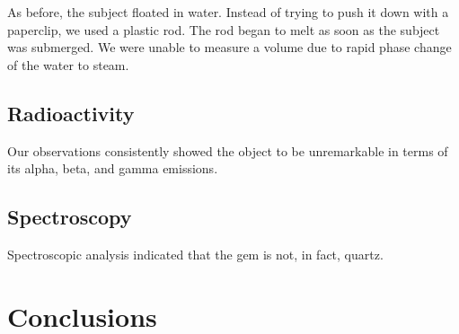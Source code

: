 \documentclass[10pt]{article}
\begin{document}
As before, the subject floated in water.
Instead of trying to push it down with a paperclip, we used a plastic rod.
The rod began to melt as soon as the subject was submerged.
We were unable to measure a volume due to rapid phase change of the water to steam.

\subsection{Radioactivity}
Our observations consistently showed the object to be unremarkable in terms of its alpha, beta, and gamma emissions.

\subsection{Spectroscopy}
Spectroscopic analysis indicated that the gem is not, in fact, quartz.

\section{Conclusions}\label{conclusions}





\end{document}
